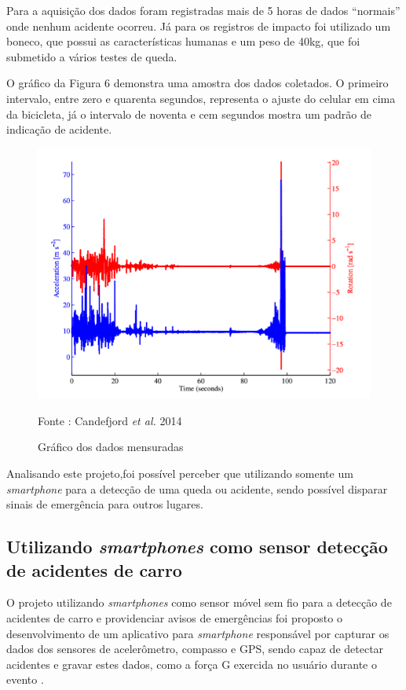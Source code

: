 Para a aquisição dos dados foram registradas mais de 5 horas de dados “normais” onde nenhum acidente ocorreu. Já para os registros de impacto foi utilizado um boneco, que possui as características humanas e um peso de 40kg, que foi submetido a vários testes de queda.

 O gráfico da Figura 6 demonstra uma amostra dos dados coletados. O primeiro intervalo, entre zero e quarenta segundos, representa o ajuste do celular em cima da bicicleta, já o intervalo de noventa e cem segundos mostra um padrão de indicação de acidente.


 \begin{figure}[H]

 \caption{Gráfico dos dados mensuradas}
  \includegraphics[width=150mm]{images/Cap2/grafico_acelera.png}
 
  \scriptsize Fonte : Candefjord \textit{et al.} 2014
\end{figure}

Analisando este projeto,foi possível perceber que utilizando  somente um \textit{smartphone} para a detecção de uma queda ou acidente, sendo possível disparar sinais de emergência para outros lugares.


\subsection{\textbf{Utilizando \textit{smartphones} como sensor detecção de acidentes de carro}}

O projeto utilizando \textit{smartphones} como sensor móvel sem fio para a detecção de acidentes de carro e providenciar avisos de emergências  foi proposto o desenvolvimento de um aplicativo para \textit{smartphone} responsável por capturar os dados dos sensores de acelerômetro, compasso e GPS, sendo capaz de detectar acidentes e gravar estes dados, como a força G exercida no usuário durante o evento \cite{thompson2010using}.

